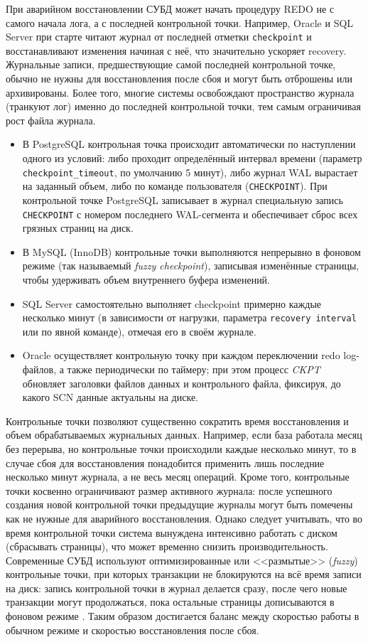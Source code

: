  При аварийном восстановлении СУБД может начать процедуру REDO не с самого начала лога, а с последней контрольной точки. Например, Oracle и SQL Server при старте читают журнал от последней отметки \texttt{checkpoint} и восстанавливают изменения начиная с неё, что значительно ускоряет recovery. Журнальные записи, предшествующие самой последней контрольной точке, обычно не нужны для восстановления после сбоя и могут быть отброшены или архивированы. Более того, многие системы освобождают пространство журнала (транкуют лог) именно до последней контрольной точки, тем самым ограничивая рост файла журнала. 
 \begin{itemize}
    \item В PostgreSQL контрольная точка происходит автоматически по наступлении одного из условий: либо проходит определённый интервал времени (параметр \texttt{checkpoint\_timeout}, по умолчанию 5 минут), либо журнал WAL вырастает на заданный объем, либо по команде пользователя (\texttt{CHECKPOINT}). При контрольной точке PostgreSQL записывает в журнал специальную запись \texttt{CHECKPOINT} с номером последнего WAL-сегмента и обеспечивает сброс всех грязных страниц на диск. 
    \item В MySQL (InnoDB) контрольные точки выполняются непрерывно в фоновом режиме (так называемый \textit{fuzzy checkpoint}), записывая изменённые страницы, чтобы удерживать объем внутреннего буфера изменений. 
    \item SQL Server самостоятельно выполняет checkpoint примерно каждые несколько минут (в зависимости от нагрузки, параметра \texttt{recovery interval} или по явной команде), отмечая его в своём журнале. 
    \item Oracle осуществляет контрольную точку при каждом переключении redo log-файлов, а также периодически по таймеру; при этом процесс \textit{CKPT} обновляет заголовки файлов данных и контрольного файла, фиксируя, до какого SCN данные актуальны на диске. 
 \end{itemize}

 Контрольные точки позволяют существенно сократить время восстановления и объем обрабатываемых журнальных данных. Например, если база работала месяц без перерыва, но контрольные точки происходили каждые несколько минут, то в случае сбоя для восстановления понадобится применить лишь последние несколько минут журнала, а не весь месяц операций. Кроме того, контрольные точки косвенно ограничивают размер активного журнала: после успешного создания новой контрольной точки предыдущие журналы могут быть помечены как не нужные для аварийного восстановления. Однако следует учитывать, что во время контрольной точки система вынуждена интенсивно работать с диском (сбрасывать страницы), что может временно снизить производительность. Современные СУБД используют оптимизированные или <<размытые>> (\textit{fuzzy}) контрольные точки, при которых транзакции не блокируются на всё время записи на диск: запись контрольной точки в журнал делается сразу, после чего новые транзакции могут продолжаться, пока остальные страницы дописываются в фоновом режиме \autocite{ElmasriNavathe}. Таким образом достигается баланс между скоростью работы в обычном режиме и скоростью восстановления после сбоя.

